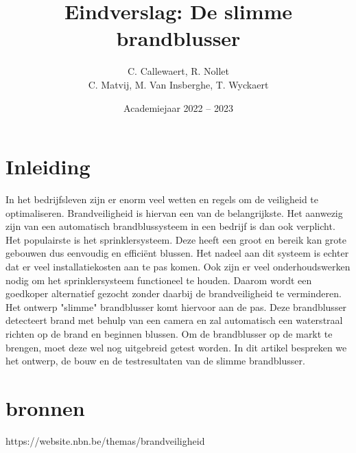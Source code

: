 \documentclass{kulakarticle}
\title{Eindverslag: De slimme brandblusser}
\author{C. Callewaert, R. Nollet \\
	 C. Matvij, M. Van Insberghe, T. Wyckaert }
\date{Academiejaar 2022 -- 2023}
\begin{document}
	
\maketitle
	
\section*{Inleiding}

In het bedrijfsleven zijn er enorm veel wetten en regels om de veiligheid te optimaliseren. Brandveiligheid is hiervan een van de belangrijkste. Het aanwezig zijn van een automatisch brandblussysteem in een bedrijf is dan ook verplicht. Het populairste is het sprinklersysteem. Deze heeft een groot en bereik kan grote gebouwen dus eenvoudig en efficiënt blussen. Het nadeel aan dit systeem is echter dat er veel installatiekosten aan te pas komen. Ook zijn er veel onderhoudswerken nodig om het sprinklersysteem functioneel te houden. Daarom wordt een goedkoper alternatief gezocht zonder daarbij de brandveiligheid te verminderen. Het ontwerp "slimme" brandblusser komt hiervoor aan de pas. Deze brandblusser detecteert brand met behulp van een camera en zal automatisch een waterstraal richten op de brand en beginnen blussen. Om  de brandblusser op de markt te brengen, moet deze wel nog uitgebreid getest worden. In dit artikel bespreken we het ontwerp, de bouw en de testresultaten van de slimme brandblusser. 


\section*{bronnen}
https://website.nbn.be/themas/brandveiligheid
\end{document}
